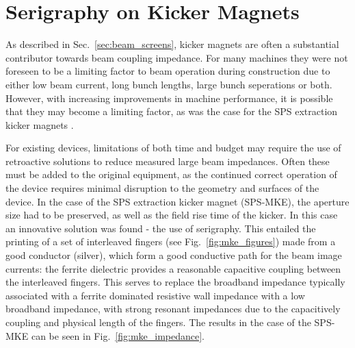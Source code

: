\section{Serigraphy on Kicker Magnets}
\label{sec:seriagraphy}

As described in Sec.~\ref{sec:beam_screens}, kicker magnets are often a substantial contributor towards beam coupling impedance. For many machines they were not foreseen to be a limiting factor to beam operation during construction due to either low beam current, long bunch lengths, large bunch seperations or both. However, with increasing improvements in machine performance, it is possible that they may become a limiting factor, as was the case for the SPS extraction kicker magnets \cite{Kroyer:MKEReduct}. 

For existing devices, limitations of both time and budget may require the use of retroactive solutions to reduce measured large beam impedances. Often these must be added to the original equipment, as the continued correct operation of the device requires minimal disruption to the geometry and surfaces of the device. In the case of the SPS extraction kicker magnet (SPS-MKE), the aperture size had to be preserved, as well as the field rise time of the kicker. In this case an innovative solution was found - the use of serigraphy. This entailed the printing of a set of interleaved fingers (see Fig.~\ref{fig:mke_figures}) made from a good conductor (silver), which form a good conductive path for the beam image currents: the ferrite dielectric provides a reasonable capacitive coupling between the interleaved fingers. This serves to replace the broadband impedance typically associated with a ferrite dominated resistive wall impedance with a low broadband impedance, with strong resonant impedances due to the capacitively coupling and physical length of the fingers. The results in the case of the SPS-MKE can be seen in Fig.~\ref{fig:mke_impedance}.



